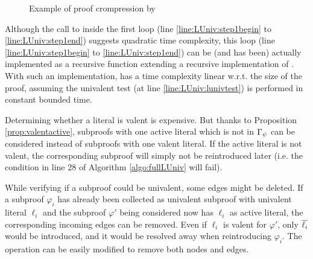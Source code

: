 \documentclass{llncs}
\begin{document}
\begin{figure}[htb]
  \centering
   \qquad
  \centering
\caption{Example of proof crompression by \LowerUnivalents} 
\label{fig:exluniv}
\end{figure}



Although the
call to  inside the first loop (line \ref{line:LUniv:step1begin} to
\ref{line:LUniv:step1end}) suggests quadratic time complexity, this loop (line
\ref{line:LUniv:step1begin} to \ref{line:LUniv:step1end}) can be (and has been) actually implemented
as a recursive function extending a recursive implementation of . With such an
implementation, {\LowerUnivalents} has a time complexity linear w.r.t. the size of the proof, assuming the
univalent test (at line \ref{line:LUniv:lunivtest}) is performed in constant bounded time. 


Determining whether a literal is valent is expensive. But thanks to Proposition \ref{prop:valentactive},
subproofs with one active literal which is not in $\Gamma_{\psi}$ can be considered instead
of subproofs with one valent literal.  If the active literal is not valent, the corresponding
subproof will simply not be reintroduced later (i.e. the condition in line 28 of Algorithm \ref{algo:fullLUniv} will fail).

While verifying if a subproof could be univalent, some edges might be deleted. If a
subproof $\varphi_i$ has already been collected as univalent subproof with univalent literal
$\ell_i$ and the subproof $\varphi'$ being considered now has $\ell_i$ as active literal, the
corresponding incoming edges can be removed. Even if $\ell_i$ is valent for $\varphi'$, only
$\overline{\ell_i}$ would be introduced, and it would be resolved away when reintroducing
$\varphi_i$. The  operation can be easily modified to remove both nodes and edges.
\end{document}
